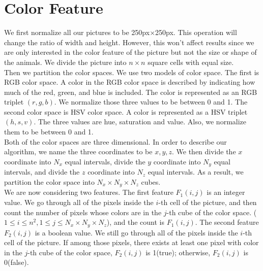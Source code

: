 \documentclass[12pt]{article}
\begin{document}
\section{Color Feature}
We first normalize all our pictures to be 250px$ \times $250px. This operation will change the ratio of width and height. However, this won't affect results since we are only interested in the color feature of the picture but not the size or shape of the animals. We divide the picture into $n\times n$ square cells with equal size. \\
Then we partition the color spaces. We use two models of color space. The first is RGB color space. A color in the RGB color space is described by indicating how much of the red, green, and blue is included. The color is represented as an RGB triplet $(r, g, b)$. We normalize those three values to be between 0 and 1. 
The second color space is HSV color space. A color is represented as a HSV triplet $(h, s, v)$. The three values are hue, saturation and value. Also, we normalize them to be between 0 and 1. \\
Both of the color spaces are three dimensional. In order to describe our algorithm, we name the three coordinates to be $x, y, z$. We then divide the $x$ coordinate into $N_x$ equal intervals, divide the $y$ coordinate into $N_y$ equal intervals, and divide the $z$ coordinate into $N_z$ equal intervals. As a result, we partition the color space into $N_x \times N_y \times N_z$ cubes. \\
We are now considering two features. The first feature $F_1(i, j)$ is an integer value. We go through all of the pixels inside the $i$-th cell of the picture, and then count the number of pixels whose colors are in the $j$-th cube of the color space. ($ 1 \leq i \leq n^2, 1 \leq j \leq N_x \times N_y \times N_z $), and the count is $F_1(i, j)$. The second feature $F_2(i, j)$ is a boolean value. We still go through all of the pixels inside the $i$-th cell of the picture. If among those pixels, there exists at least one pixel with color in the $j$-th cube of the color space, $F_2(i, j)$ is 1(true); otherwise, $F_2(i, j)$ is 0(false).\\
\end{document}
